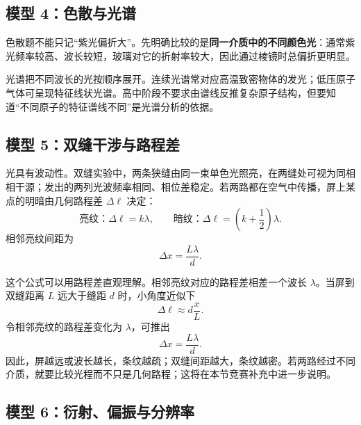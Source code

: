 \subsection*{模型 4：色散与光谱}

色散题不能只记“紫光偏折大”。先明确比较的是\textbf{同一介质中的不同颜色光}：通常紫光频率较高、波长较短，玻璃对它的折射率较大，因此通过棱镜时总偏折更明显。

光谱把不同波长的光按顺序展开。连续光谱常对应高温致密物体的发光；低压原子气体可呈现特征线状光谱。高中阶段不要求由谱线反推复杂原子结构，但要知道“不同原子的特征谱线不同”是光谱分析的依据。

\subsection*{模型 5：双缝干涉与路程差}

光具有波动性。双缝实验中，两条狭缝由同一束单色光照亮，在两缝处可视为同相相干源；发出的两列光波频率相同、相位差稳定。若两路都在空气中传播，屏上某点的明暗由几何路程差 $\Delta\ell$ 决定：
\[
\text{亮纹：}\Delta\ell=k\lambda,\qquad
\text{暗纹：}\Delta\ell=\left(k+\frac12\right)\lambda.
\]
相邻亮纹间距为
\[
\Delta x=\frac{L\lambda}{d}.
\]

\begin{center}


\label{fig:double-slit-interference}
\end{center}

这个公式可以用路程差直观理解。相邻亮纹对应的路程差相差一个波长 $\lambda$。当屏到双缝距离 $L$ 远大于缝距 $d$ 时，小角度近似下
\[
\Delta \ell \approx d\frac{x}{L}.
\]
令相邻亮纹的路程差变化为 $\lambda$，可推出
\[
\Delta x=\frac{L\lambda}{d}.
\]
因此，屏越远或波长越长，条纹越疏；双缝间距越大，条纹越密。若两路经过不同介质，就要比较光程而不只是几何路程；这将在本节竞赛补充中进一步说明。

\begin{center}


\label{fig:double-slit-path-difference}
\end{center}

\subsection*{模型 6：衍射、偏振与分辨率}


